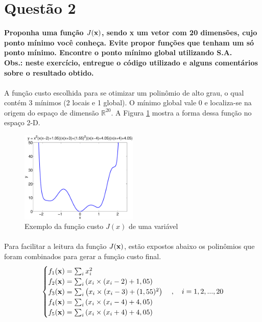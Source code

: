\documentclass{report}
\begin{document}
\section*{Questão 2}

\textbf{Proponha uma função $J(\text{\textbf{x}})$, sendo \textbf{x} um vetor com 20 dimensões, cujo ponto mínimo você conheça. Evite propor funções que tenham um só ponto mínimo. Encontre o ponto mínimo global utilizando S.A.}\\

\textbf{Obs.: neste exercício, entregue o código utilizado e alguns comentários sobre o resultado obtido.}\\

\paragraph{} A função custo escolhida para se otimizar um polinômio de alto grau, o qual contém 3 mínimos (2 locais e 1 global). O mínimo global vale 0 e localiza-se na origem do espaço de dimensão $\mathbb{R}^{20}$. A Figura \ref{funcao_custo} mostra a forma dessa função no espaço 2-D.\\

\begin{figure}[H]
	\centering
	\includegraphics[width=0.5\textwidth]{Q2_funcao_J_2D}
	\caption{Exemplo da função custo $J(x)$ de uma variável}
	\label{funcao_custo}
\end{figure}

\paragraph{} Para facilitar a leitura da função $J(\text{\textbf{x}})$, estão expostos abaixo os polinômios que foram combinados para gerar a função custo final.\\

\begin{equation*}
\begin{cases}
	f_1(\text{\textbf{x}}) = \sum_i x_i^2\\
	f_2(\text{\textbf{x}}) = \sum_i \left(x_i \times (x_i - 2)+1,05\right)\\
	f_3(\text{\textbf{x}}) = \sum_i \left(x_i \times (x_i - 3)+(1,55)^2\right)\\
	f_4(\text{\textbf{x}}) = \sum_i \left(x_i \times (x_i - 4)+4,05\right)\\
	f_5(\text{\textbf{x}}) = \sum_i \left(x_i \times (x_i + 4)+4,05\right)
\end{cases}, \quad i = 1,2,...,20
\end{equation*}\\
\end{document}
